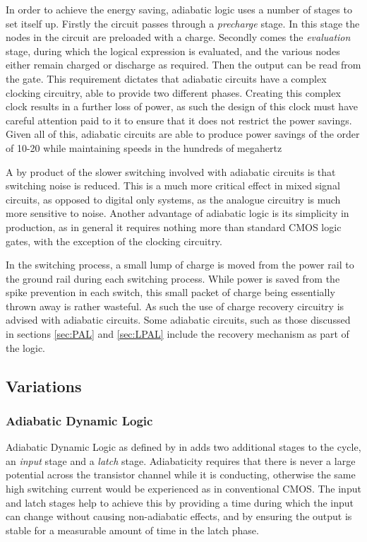 In order to achieve the energy saving, adiabatic logic uses a number of stages to set itself up.
Firstly the circuit passes through a \emph{precharge} stage.
In this stage the nodes in the circuit are preloaded with a charge.
Secondly comes the \emph{evaluation} stage, during which the logical expression is evaluated, and the various nodes either remain charged or discharge as required.
Then the output can be read from the gate.
This requirement dictates that adiabatic circuits have a complex clocking circuitry, able to provide two different phases.
Creating this complex clock results in a further loss of power, as such the design of this clock must have careful attention paid to it to ensure that it does not restrict the power savings.
Given all of this, adiabatic circuits are able to produce power savings of the order of 10-20 while maintaining speeds in the hundreds of megahertz \cite{PAL, SCAL, DynAdiabatic, TSEL, PALadder}

A by product of the slower switching involved with adiabatic circuits is that switching noise is reduced.
This is a much more critical effect in mixed signal circuits, as opposed to digital only systems, as the analogue circuitry is much more sensitive to noise.
Another advantage of adiabatic logic is its simplicity in production, as in general it requires nothing more than standard CMOS logic gates, with the exception of the clocking circuitry.

In the switching process, a small lump of charge is moved from the power rail to the ground rail during each switching process.
While power is saved from the spike prevention in each switch, this small packet of charge being essentially thrown away is rather wasteful.
As such the use of charge recovery circuitry is advised with adiabatic circuits.
Some adiabatic circuits, such as those discussed in sections \ref{sec:PAL} and \ref{sec:LPAL} include the recovery mechanism as part of the logic.

\subsection{Variations}

\subsubsection{Adiabatic Dynamic Logic}
\label{sec:ADL}
Adiabatic Dynamic Logic as defined by \citeauthor{DynAdiabatic} in \cite{DynAdiabatic} adds two additional stages to the cycle, an \emph{input} stage and a \emph{latch} stage. 
Adiabaticity requires that there is never a large potential across the transistor channel while it is conducting, otherwise the same high switching current would be experienced as in conventional CMOS.
The input and latch stages help to achieve this by providing a time during which the input can change without causing non-adiabatic effects, and by ensuring the output is stable for a measurable amount of time in the latch phase.

